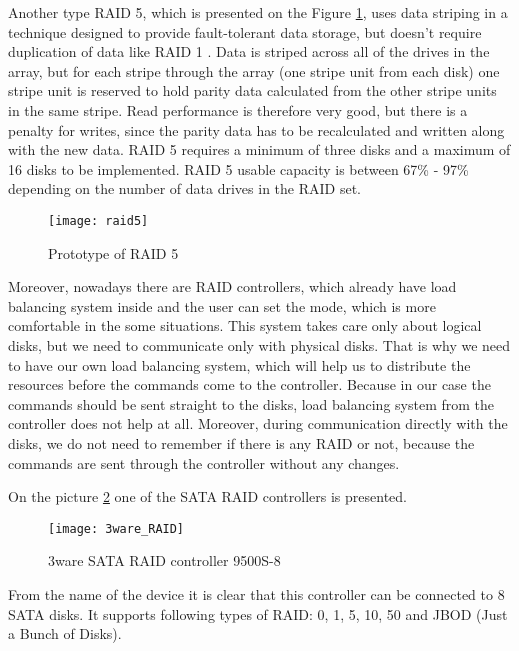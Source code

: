 Another type RAID 5, which is presented on the Figure \ref{fig:raid5}, uses data striping in a technique designed to provide fault-tolerant data storage, but doesn't require duplication of data like RAID 1 \cite{raid_overview}. Data is striped across all of the drives in the array, but for each stripe through the array (one stripe unit from each disk) one stripe unit is reserved to hold parity data calculated from the other stripe units in the same stripe. Read performance is therefore very good, but there is a penalty for writes, since the parity data has to be recalculated and written along with the new data. RAID 5 requires a minimum of three disks and a maximum of 16 disks to be implemented. RAID 5 usable capacity is between 67\% - 97\% depending on the number of data drives in the RAID set.
\begin{figure}[h]
\begin{center}
  \texttt{[image: raid5]}
\end{center}
  \caption{Prototype of RAID 5}
  \label{fig:raid5}
\end{figure}
Moreover, nowadays there are RAID controllers, which already have load balancing system inside and the user can set the mode, which is more comfortable in the some situations. This system takes care only about logical disks, but we need to communicate only with physical disks. That is why we need to have our own load balancing system, which will help us to distribute the resources before the commands come to the controller. Because in our case the commands should be sent straight to the disks, load balancing system from the controller does not help at all. Moreover, during communication directly with the disks, we do not need to remember if there is any RAID or not, because the commands are sent through the controller without any changes.  

On the picture \ref{fig:3ware_RAID} one of the SATA RAID controllers is presented. 
\begin{figure}[h]
\begin{center}
  \texttt{[image: 3ware\_RAID]}
\end{center}
  \caption{3ware SATA RAID controller 9500S-8}
  \label{fig:3ware_RAID}
\end{figure}
From the name of the device it is clear that this controller can be connected to 8 SATA disks. It supports following types of RAID: 0, 1, 5, 10, 50 and JBOD (Just a Bunch of Disks).

\newpage
